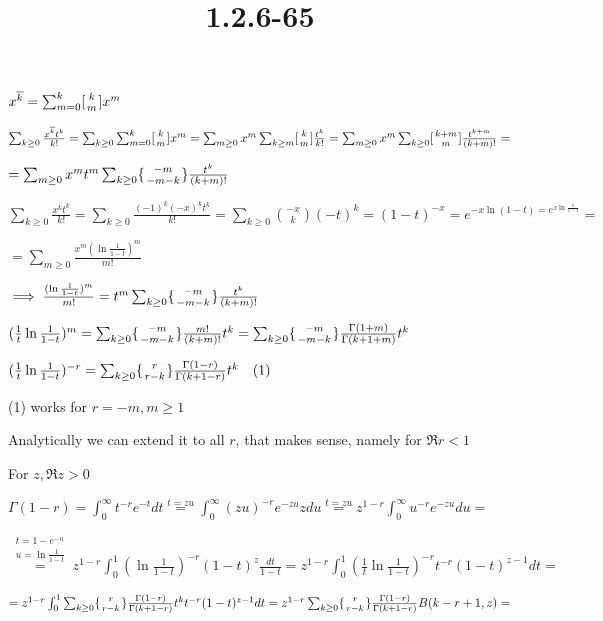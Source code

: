 \documentclass{article}
\title{1.2.6-65}
\begin{document}
\maketitle

\( x^{\overline{k}} = \sum_{m=0}^k [{k \atop m}]x^m \)

\( \sum_{k \geq 0} \frac{x^{\overline{k}}t^k}{k!} = \sum_{k \geq 0} \sum_{m=0}^k [{k \atop m}]x^m = \sum_{m\geq 0}x^m \sum_{k \geq m} [{k \atop m}] \frac{t^k}{k!} = \sum_{m\geq 0}x^m \sum_{k \geq 0} [{{k + m} \atop m}] \frac{t^{k+m}}{(k+m)!} = \)

\( = \sum_{m\geq 0}x^mt^m \sum_{k \geq 0} \{{{-m} \atop {-m-k}}\} \frac{t^{k}}{(k+m)!} \)

\( \sum_{k \geq 0} \frac{x^{\overline{k}}t^k}{k!} = \sum_{k \geq 0} \frac{(-1)^k(-x)^{\underline{k}}t^k}{k!} = \sum_{k \geq 0} \binom{-x}{k}(-t)^k = (1-t)^{-x} = e^{-x \ln(1-t) = e^{x\ln\frac{1}{1-t}}} = \)

\( = \sum_{m \geq 0}\frac{x^m(\ln\frac{1}{1-t})^m}{m!} \)

\( \implies \frac{(\ln\frac{1}{1-t})^m}{m!} = t^m \sum_{k \geq 0} \{{{-m} \atop {-m-k}}\} \frac{t^{k}}{(k+m)!} \)

\( (\frac{1}{t}\ln\frac{1}{1-t})^m = \sum_{k \geq 0} \{{{-m} \atop {-m-k}}\} \frac{m!}{(k+m)!} t^{k} = \sum_{k \geq 0} \{{{-m} \atop {-m-k}}\} \frac{\Gamma(1+m)}{\Gamma(k+1+m)} t^{k} \)

\( (\frac{1}{t}\ln\frac{1}{1-t})^{-r} = \sum_{k \geq 0} \{{{r} \atop {r-k}}\} \frac{\Gamma(1-r)}{\Gamma(k+1-r)} t^{k}\quad (1) \)

(1) works for \( r = -m, m \geq 1 \)

Analytically we can extend it to all \( r \), that makes sense, namely for \( \Re{r} < 1 \)

For \( z, \Re z > 0 \)

\( \Gamma(1-r) = \int_0^\infty t^{-r} e^{-t} dt \overset{t=zu}{=} \int_0^\infty (zu)^{-r} e^{-zu} z du \overset{t=zu}{=} z^{1-r} \int_0^\infty u^{-r}e^{-zu}du = \)

\( \overset{\substack{t = 1 - e^{-u}\\u = \ln{\frac{1}{1-t}}}}{=} z^{1-r} \int_0^1 (\ln{\frac{1}{1-t}})^{-r} (1-t)^z \frac{dt}{1-t} = z^{1-r} \int_0^1 (\frac{1}{t}\ln{\frac{1}{1-t}})^{-r} t^{-r}(1-t)^{z-1} dt = \)

\( = z^{1-r} \int_0^1 \sum_{k \geq 0} \{{{r} \atop {r-k}}\} \frac{\Gamma(1-r)}{\Gamma(k+1-r)} t^{k} t^{-r} (1-t)^{z-1} dt = z^{1-r} \sum_{k \geq 0} \{{{r} \atop {r-k}}\} \frac{\Gamma(1-r)}{\Gamma(k+1-r)} B(k-r+1,z) = \)
\end{document}
